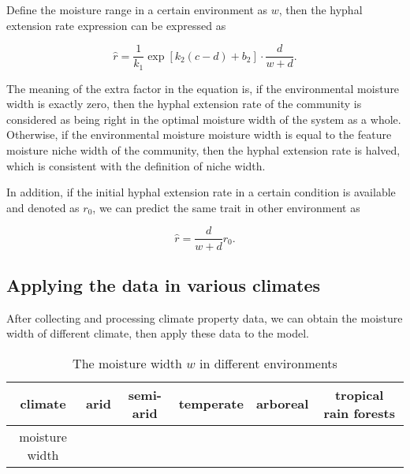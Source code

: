 Define the moisture range in a certain environment as $w$, then the hyphal extension rate expression can be expressed as

\begin{equation}
    \hat{r} =
    \frac{1}{k_1} \exp[k_2(c -d) +b_2]\cdot
    \frac{d}{w + d}.
\end{equation}

The meaning of the extra factor in the equation is, if the environmental moisture width is exactly zero, then the hyphal extension rate of the community is considered as being right in the optimal moisture width of the system as a whole. Otherwise, if the environmental moisture moisture width is equal to the feature moisture niche width of the community, then the hyphal extension rate is halved, which is consistent with the definition of niche width.

In addition, if the initial hyphal extension rate in a certain condition is available and denoted as $r_0$, we can predict the same trait in other environment as

\begin{equation}\label{eq:env}
    \hat{r} = \frac{d}{w + d}r_0.
\end{equation}

\subsection{Applying the data in various climates}

After collecting and processing climate property data, we can obtain the moisture width of different climate, then apply these data to the model.

\begin{table}[h]\caption{The moisture width $w$ in different environments}
    \centering
    \begin{tabular}{c|ccccc}
        \toprule
        climate        & arid & semi-arid & temperate & arboreal & tropical rain forests \\
        \midrule
        moisture width &      &           &           &          &                       \\
        \bottomrule
    \end{tabular}
\end{table}
